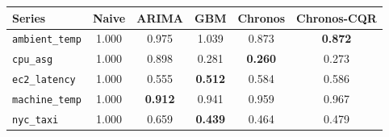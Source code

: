\begin{tabular}{lccccc}
\toprule
Series & Naive & ARIMA & GBM & Chronos & Chronos-CQR \\
\midrule
\texttt{ambient\_temp} & 1.000 & 0.975 & 1.039 & 0.873 & \textbf{0.872} \\
\texttt{cpu\_asg} & 1.000 & 0.898 & 0.281 & \textbf{0.260} & 0.273 \\
\texttt{ec2\_latency} & 1.000 & 0.555 & \textbf{0.512} & 0.584 & 0.586 \\
\texttt{machine\_temp} & 1.000 & \textbf{0.912} & 0.941 & 0.959 & 0.967 \\
\texttt{nyc\_taxi} & 1.000 & 0.659 & \textbf{0.439} & 0.464 & 0.479 \\
\bottomrule
\end{tabular}
